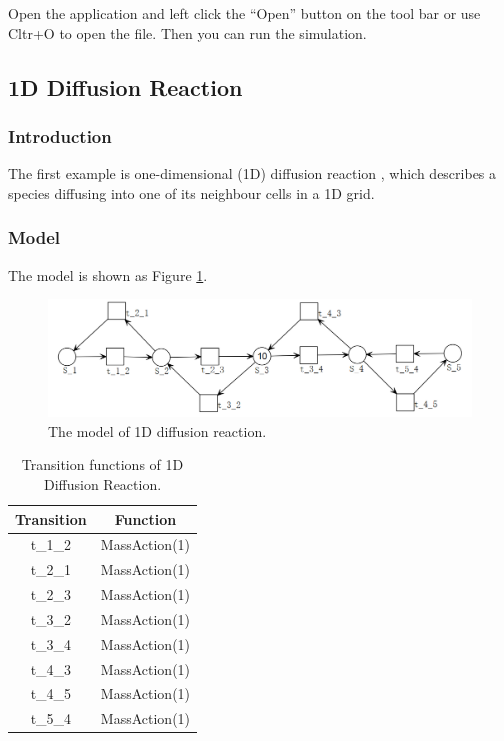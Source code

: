 \documentclass[journal,a4paper,onecolumn]{article}
\begin{document}
Open the application and left click the ``Open'' button on the tool bar or use Cltr+O to open the file. Then you can run the simulation.

\subsection{1D Diffusion Reaction}

\subsubsection{Introduction}
The first example is one-dimensional (1D) diffusion reaction \cite{LBHY14}, which describes a species diffusing into one of its neighbour cells in a 1D grid.

\subsubsection{Model}
The model is shown as Figure \ref{fig:The model of 1D diffusion reaction}.
\begin{figure}[!hbt]
	\begin{center}
		\includegraphics[width=\columnwidth]{fig20}
		\caption{The model of 1D diffusion reaction.}
		\label{fig:The model of 1D diffusion reaction}
	\end{center}
\end{figure}

\begin{table}[!hbt]
	\begin{center}
		\caption{Transition functions of 1D Diffusion Reaction.}
		\label{Transition functions of 1D Diffusion Reaction}
		\begin{tabular}{|c|c|}
			\hline
			Transition&Function\\
			\hline
			t\_1\_2&MassAction(1)\\
			\hline
						t\_2\_1&MassAction(1)\\
			\hline
						t\_2\_3&MassAction(1)\\
			\hline
						t\_3\_2&MassAction(1)\\
			\hline
						t\_3\_4&MassAction(1)\\
			\hline
						t\_4\_3&MassAction(1)\\
			\hline
						t\_4\_5&MassAction(1)\\
			\hline
						t\_5\_4&MassAction(1)\\
			\hline
		\end{tabular}
	\end{center}
\end{table}
\end{document}
